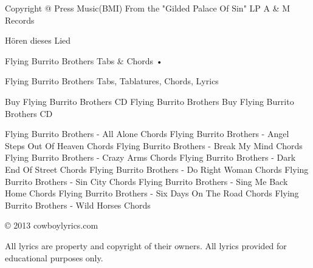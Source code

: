               Copyright @ Press Music(BMI)
              From the "Gilded Palace Of Sin" LP
              A & M Records

	Hören dieses Lied 			



Flying Burrito Brothers Tabs & Chords •

Flying Burrito Brothers Tabs, Tablatures, Chords, Lyrics

Buy Flying Burrito Brothers CD
Flying Burrito Brothers
Buy Flying Burrito Brothers CD 	

    Flying Burrito Brothers - All Alone Chords
    Flying Burrito Brothers - Angel Steps Out Of Heaven Chords
    Flying Burrito Brothers - Break My Mind Chords
    Flying Burrito Brothers - Crazy Arms Chords
    Flying Burrito Brothers - Dark End Of Street Chords
    Flying Burrito Brothers - Do Right Woman Chords
    Flying Burrito Brothers - Sin City Chords
    Flying Burrito Brothers - Sing Me Back Home Chords
    Flying Burrito Brothers - Six Days On The Road Chords
    Flying Burrito Brothers - Wild Horses Chords




© 2013 cowboylyrics.com
	
	
All lyrics are property and copyright of their owners. All lyrics provided for educational purposes only.

